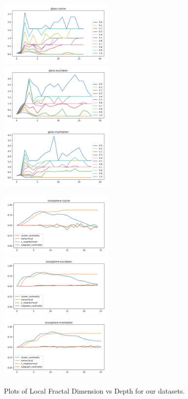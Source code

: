\begin{figure}[!t]
\includegraphics[width=2.2in]{kdd/static/lfd_vs_depth/glass-cosine.png}
\includegraphics[width=2.2in]{kdd/static/lfd_vs_depth/glass-euclidean.png}
\includegraphics[width=2.2in]{kdd/static/lfd_vs_depth/glass-manhattan.png}

\includegraphics[width=2.2in]{kdd/static/auc_vs_depth/ionosphere-cosine.png}
\includegraphics[width=2.2in]{kdd/static/auc_vs_depth/ionosphere-euclidean.png}
\includegraphics[width=2.2in]{kdd/static/auc_vs_depth/ionosphere-manhattan.png}

\caption{
Plots of Local Fractal Dimension vs Depth for our datasets.
}

\label{results:lfd_1}
\end{figure}

